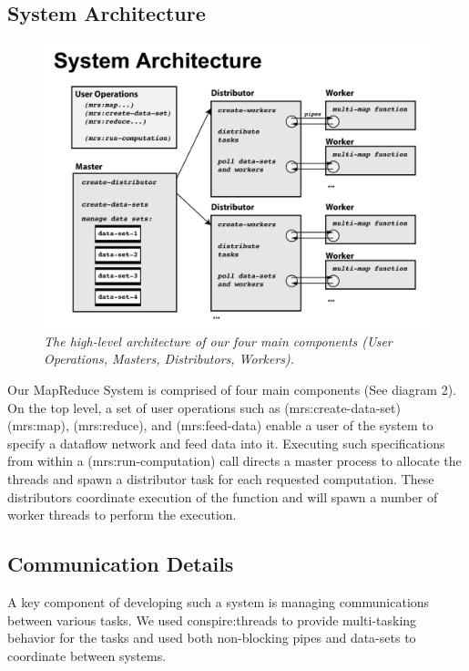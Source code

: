 \documentclass{article}
\begin{document}
\subsection{System Architecture}

\begin{figure}[h!]
\includegraphics[width=\textwidth]{system-arch.png}
  \caption{\emph{\small The high-level architecture of our four main
      components (User Operations, Masters, Distributors, Workers).}}
\label{piefig}
\end{figure}

Our MapReduce System is comprised of four main components (See diagram
2). On the top level, a set of user operations such as (mrs:create-data-set)
(mrs:map), (mrs:reduce), and (mrs:feed-data) enable a user
of the system to specify a dataflow network and feed data into
it. Executing such specifications from within a
(mrs:run-computation) call directs a master process to allocate the
threads and spawn a distributor task for each requested
computation. These distributors coordinate execution of the function
and will spawn a number of worker threads to perform the execution.

\subsection{Communication Details}

A key component of developing such a system is managing communications
between various tasks. We used conspire:threads to provide
multi-tasking behavior for the tasks and used both non-blocking pipes
and data-sets to coordinate between systems. 
\end{document}
